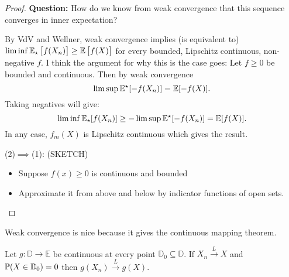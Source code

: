 \begin{proof}
	\textbf{Question:} How do we know from weak convergence that this sequence converges in inner expectation? 

	By VdV and Wellner, weak convergence implies (is equivalent to) \(\lim\inf \E_\star\left[f(X_n)\right] \geq \E\left[f(X)\right]\) for every bounded, Lipschitz continuous, non-negative \(f\). I think the argument for why this is the case goes: Let \(f \geq 0\) be bounded and continuous. Then by weak convergence
	\[
		\lim\sup \E^\star[-f(X_n)] = \E[-f(X)]
	.\] 
	Taking negatives will give:
	\[
		\lim\inf \E_\star[f(X_n)] \geq - \lim\sup \E^\star[-f(X_n)] = \E[f(X)]
	.\] 
	In any case, \(f_m(X)\) is Lipschitz continuous which gives the result. 

	(2)\(\implies\)(1): (SKETCH)
	\begin{itemize}
		\item Suppose \(f(x) \geq 0\) is continuous and bounded
		\item Approximate it from above and below by indicator functions of open sets.
	\end{itemize} 
\end{proof}

Weak convergence is nice because it gives the continuous mapping theorem. 
\begin{theorem}
	\label{thm:cmt}
	Let \(g:\mathbb{D}\to \mathbb{E}\) be continuous at every point \(\mathbb{D}_0 \subseteq \mathbb{D}\). If  \(X_n \overset{L}\to X\) and  \(\P(X\in\mathbb{D}_0) = 0\) then  \(g(X_n) \overset{L}\to g(X)\).
\end{theorem}

